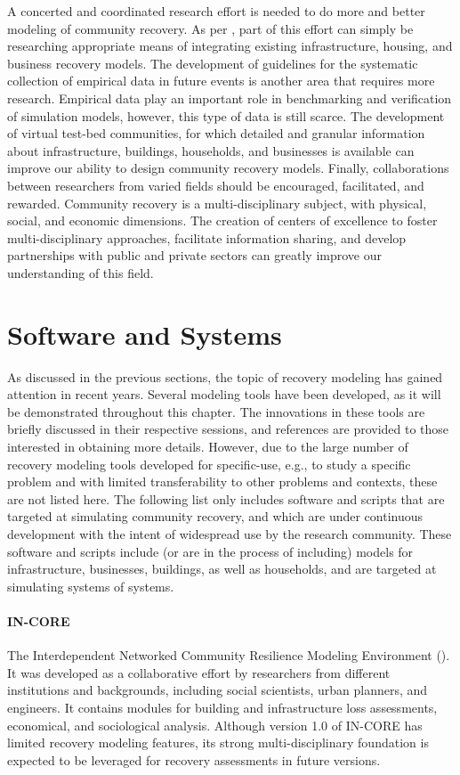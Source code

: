 A concerted and coordinated research effort is needed to do more and better modeling of community recovery. As per \citep{miles2019community}, part of this effort can simply be researching appropriate means of integrating existing infrastructure, housing, and business recovery models. The development of guidelines for the systematic collection of empirical data in future events is another area that requires more research. Empirical data play an important role in benchmarking and verification of simulation models, however, this type of data is still scarce. The development of virtual test-bed communities, for which detailed and granular information about infrastructure, buildings, households, and businesses is available can improve our ability to design community recovery models. Finally, collaborations between researchers from varied fields should be encouraged, facilitated, and rewarded. Community recovery is a multi-disciplinary subject, with physical, social, and economic dimensions. The creation of centers of excellence to foster multi-disciplinary approaches, facilitate information sharing, and develop partnerships with public and private sectors can greatly improve our understanding of this field.\ 

\FloatBarrier
\section{Software and Systems}
As discussed in the previous sections, the topic of recovery modeling has gained attention in recent years. Several modeling tools have been developed, as it will be demonstrated throughout this chapter. The innovations in these tools are briefly discussed in their respective sessions, and references are provided to those interested in obtaining more details. However, due to the large number of recovery modeling tools developed for specific-use, e.g., to study a specific problem and with limited transferability to other problems and contexts, these are not listed here. The following list only includes software and scripts that are targeted at simulating community recovery, and which are under continuous development with the intent of widespread use by the research community. These software and scripts include (or are in the process of including) models for infrastructure, businesses, buildings, as well as households, and are targeted at simulating systems of systems.\

\paragraph{IN-CORE}
The Interdependent Networked Community Resilience Modeling Environment (). It was developed as a collaborative effort by researchers from different institutions and backgrounds, including social scientists, urban planners, and engineers. It contains modules for building and infrastructure loss assessments, economical, and sociological analysis. Although version 1.0 of IN-CORE has limited recovery modeling features, its strong multi-disciplinary foundation is expected to be leveraged for recovery assessments in future versions.

